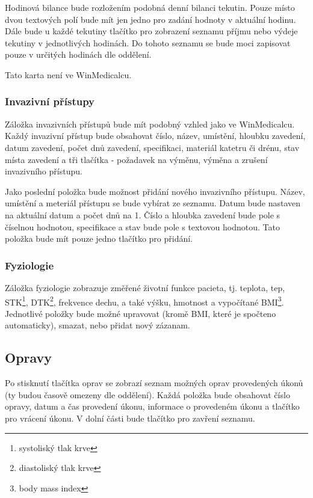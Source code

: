 Hodinová bilance bude rozložením podobná denní bilanci tekutin. Pouze místo dvou textových polí bude mít jen jedno pro zadání hodnoty v aktuální hodinu. Dále bude u každé tekutiny tlačítko pro zobrazení seznamu příjmu nebo výdeje tekutiny v jednotlivých hodinách. Do tohoto seznamu se bude moci zapisovat pouze v určitých hodinách dle oddělení.

Tato karta není ve WinMedicalcu.

\subsubsection{Invazivní přístupy}

Záložka invazivních přístupů bude mít podobný vzhled jako ve WinMedicalcu. Každý invazivní přístup bude obsahovat číslo, název, umístění, hloubku zavedení, datum zavedení, počet dnů zavedení, specifikaci, materiál katetru či drénu, stav místa zavedení a tři tlačítka - požadavek na výměnu, výměna a zrušení invazivního přístupu.

Jako poslední položka bude možnost přidání nového invazivního přístupu. Název, umístění a meteriál přístupu se bude vybírat ze seznamu. Datum bude nastaven na aktuální datum a počet dnů na 1. Číslo a hloubka zavedení bude pole s číselnou hodnotou, specifikace a stav bude pole s textovou hodnotou. Tato položka bude mít pouze jedno tlačítko pro přidání.

\subsubsection{Fyziologie}

Záložka fyziologie zobrazuje změřené životní funkce pacieta, tj. teplota, tep, STK\footnote{systoliský tlak krve}, DTK\footnote{diastoliský tlak krve}, frekvence dechu, a také výšku, hmotnost a vypočítané BMI\footnote{body mass index}. Jednotlivé položky bude možné upravovat (kromě BMI, které je spočteno automaticky), smazat, nebo přidat nový zázanam.

\subsection{Opravy}

Po stisknutí tlačítka oprav se zobrazí seznam možných oprav provedených úkonů (ty budou časově omezeny dle oddělení). Každá položka bude obsahovat číslo opravy, datum a čas provedení úkonu, informace o provedeném úkonu a tlačítko pro vrácení úkonu. V dolní části bude tlačítko pro zavření seznamu.